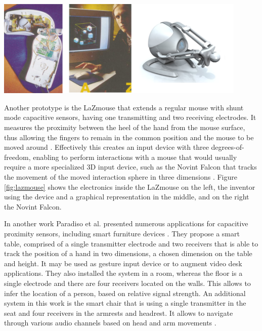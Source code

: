 \begin{minipage}{\linewidth}
\centering
\includegraphics[width=0.9\textwidth]{images/lazmouse}
\label{fig:lazmouse}
\end{minipage}

Another prototype is the LaZmouse that extends a regular mouse with shunt mode capacitive sensors, having one transmitting and two receiving electrodes. It measures the proximity between the heel of the hand from the mouse surface, thus allowing the fingers to remain in the common position and the mouse to be moved around \cite{smith1999thesis}. Effectively this creates an input device with three degrees-of-freedom, enabling to perform interactions with a mouse that would usually require a more specialized 3D input device, such as the Novint Falcon that tracks the movement of the moved interaction sphere in three dimensions \cite{novint2014}. Figure \ref{fig:lazmouse} shows the electronics inside the LaZmouse on the left, the inventor using the device and a graphical representation in the middle, and on the right the Novint Falcon.

In another work Paradiso et al. presented numerous applications for capacitive proximity sensors, including smart furniture devices \cite{ Zimmerman1995}. They propose a smart table, comprised of a single transmitter electrode and two receivers that is able to track the position of a hand in two dimensions, a chosen dimension on the table and height. It may be used as gesture input device or to augment video desk applications. They also installed the system in a room, whereas the floor is a single electrode and there are four receivers located on the walls. This allows to infer the location of a person, based on relative signal strength. An additional system in this work is the smart chair that is using a single transmitter in the seat and four receivers in the armrests and headrest. It allows to navigate through various audio channels based on head and arm movements \cite{schmandt1995audiostreamer}.

